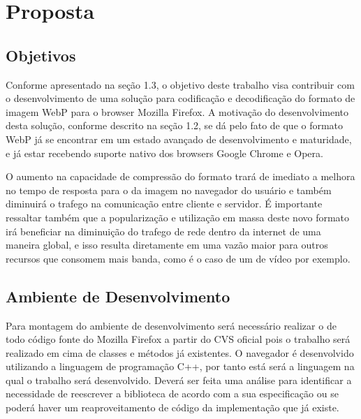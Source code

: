 \documentclass[espaco=simples,appendix=Name]{abnt}
\begin{document}
\chapter{Proposta}
\begin{description}

\section{Objetivos}

\item \noindent
Conforme apresentado na seção 1.3, o objetivo deste trabalho visa contribuir com o desenvolvimento de uma solução para codificação e decodificação do formato de imagem WebP para o browser Mozilla Firefox. 
A motivação do desenvolvimento desta solução, conforme descrito na seção 1.2, se dá pelo fato de que o formato WebP já se encontrar em um estado avançado de desenvolvimento e maturidade, e já estar recebendo suporte nativo dos browsers Google Chrome e Opera. 

O aumento na capacidade de compressão do formato  trará de imediato a melhora no tempo de resposta para o  da imagem no navegador do usuário e também diminuirá o trafego na comunicação entre cliente e servidor. É importante ressaltar também que a popularização e utilização em massa deste novo formato irá beneficiar na diminuição do trafego de rede dentro da internet de uma maneira global, e isso resulta diretamente em uma vazão maior para outros recursos que consomem mais banda, como é o caso de um  de vídeo por exemplo.

\section{Ambiente de Desenvolvimento}

\item \noindent
Para montagem do ambiente de desenvolvimento será necessário realizar o  de todo código fonte do Mozilla Firefox a partir do CVS oficial pois o trabalho será realizado em cima de classes e métodos já existentes. O navegador é desenvolvido utilizando a linguagem de programação C++, por tanto está será a linguagem na qual o trabalho será desenvolvido. Deverá ser feita uma análise para identificar a necessidade de reescrever a biblioteca  de acordo com a sua especificação ou se poderá haver um reaproveitamento de código da implementação que já existe.


\end{description}
\end{document}
